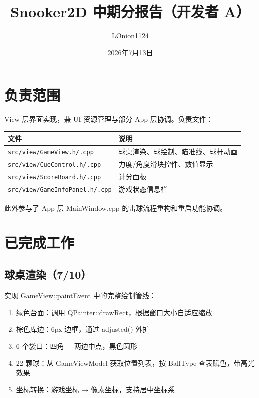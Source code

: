 \documentclass[11pt]{ctexart}
\title{Snooker2D 中期分报告（开发者 A）}
\author{LOnion1124}
\date{2026年7月13日}
\begin{document}
\maketitle

\section{负责范围}

View 层界面实现，兼 UI 资源管理与部分 App 层协调。负责文件：

\begin{center}
\begin{tabular}{|l|l|}
\hline
\textbf{文件} & \textbf{说明} \\
\hline
\texttt{src/view/GameView.h/.cpp} & 球桌渲染、球绘制、瞄准线、球杆动画 \\
\texttt{src/view/CueControl.h/.cpp} & 力度/角度滑块控件、数值显示 \\
\texttt{src/view/ScoreBoard.h/.cpp} & 计分面板 \\
\texttt{src/view/GameInfoPanel.h/.cpp} & 游戏状态信息栏 \\
\hline
\end{tabular}
\end{center}

此外参与了 App 层 MainWindow.cpp 的击球流程重构和重启功能协调。

\section{已完成工作}

\subsection{球桌渲染（7/10）}

实现 GameView::paintEvent 中的完整绘制管线：

\begin{enumerate}[leftmargin=*]
\item 绿色台面：调用 QPainter::drawRect，根据窗口大小自适应缩放
\item 棕色库边：6px 边框，通过 adjusted() 外扩
\item 6 个袋口：四角 + 两边中点，黑色圆形
\item 22 颗球：从 GameViewModel 获取位置列表，按 BallType 查表赋色，带高光效果
\item 坐标转换：游戏坐标 → 像素坐标，支持居中坐标系
\end{enumerate}
\end{document}
